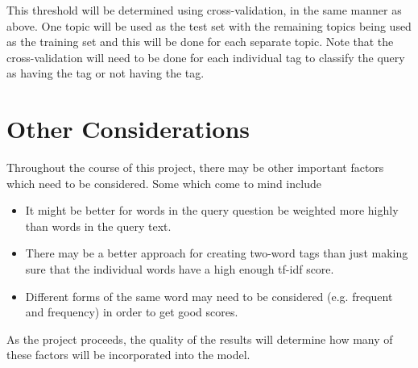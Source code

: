 \documentclass{article}
\begin{document}
This threshold will be determined using cross-validation, in the same manner
as above. One topic will be used as the test set with the remaining topics
being used as the training set and this will be done for each separate
topic. Note that the cross-validation will need to be done for each individual
tag to classify the query as having the tag or not having the tag. 

\section{Other Considerations}

Throughout the course of this project, there may be other important factors
which need to be considered. Some which come to mind include

\begin{itemize}
\item It might be better for words in the query question be weighted more
  highly than words in the query text.
\item There may be a better approach for creating two-word tags than just
  making sure that the individual words have a high enough tf-idf
  score.
\item Different forms of the same word may need to be considered
  (e.g. frequent and frequency) in order to get good scores.
\end{itemize}

As the project proceeds, the quality of the results will determine how many of
these factors will be incorporated into the model.
\end{document}
